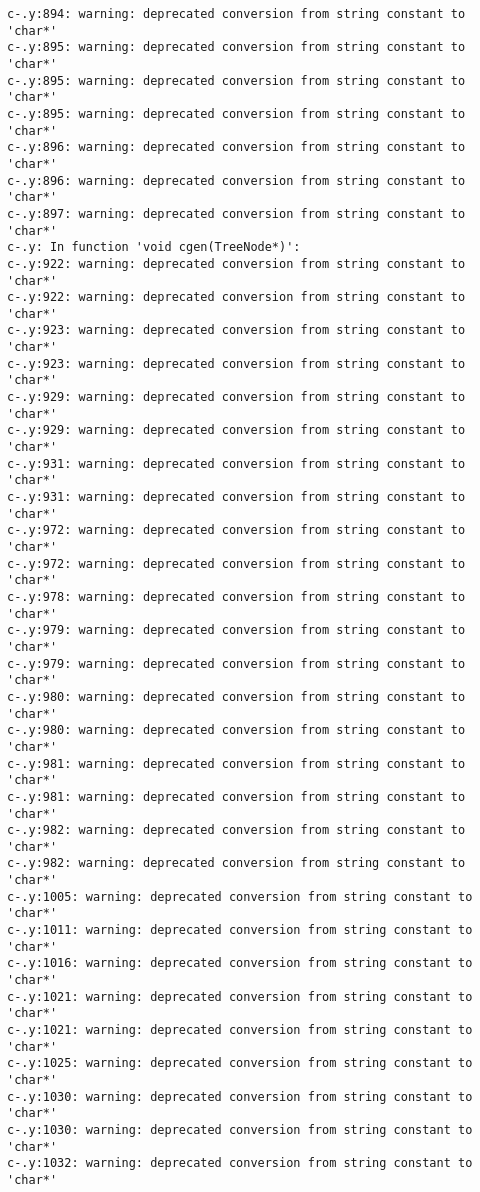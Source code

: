 \documentclass[12pt]{book}
\begin{document}
\begin{lstlisting}
c-.y:894: warning: deprecated conversion from string constant to 'char*'
c-.y:895: warning: deprecated conversion from string constant to 'char*'
c-.y:895: warning: deprecated conversion from string constant to 'char*'
c-.y:895: warning: deprecated conversion from string constant to 'char*'
c-.y:896: warning: deprecated conversion from string constant to 'char*'
c-.y:896: warning: deprecated conversion from string constant to 'char*'
c-.y:897: warning: deprecated conversion from string constant to 'char*'
c-.y: In function 'void cgen(TreeNode*)':
c-.y:922: warning: deprecated conversion from string constant to 'char*'
c-.y:922: warning: deprecated conversion from string constant to 'char*'
c-.y:923: warning: deprecated conversion from string constant to 'char*'
c-.y:923: warning: deprecated conversion from string constant to 'char*'
c-.y:929: warning: deprecated conversion from string constant to 'char*'
c-.y:929: warning: deprecated conversion from string constant to 'char*'
c-.y:931: warning: deprecated conversion from string constant to 'char*'
c-.y:931: warning: deprecated conversion from string constant to 'char*'
c-.y:972: warning: deprecated conversion from string constant to 'char*'
c-.y:972: warning: deprecated conversion from string constant to 'char*'
c-.y:978: warning: deprecated conversion from string constant to 'char*'
c-.y:979: warning: deprecated conversion from string constant to 'char*'
c-.y:979: warning: deprecated conversion from string constant to 'char*'
c-.y:980: warning: deprecated conversion from string constant to 'char*'
c-.y:980: warning: deprecated conversion from string constant to 'char*'
c-.y:981: warning: deprecated conversion from string constant to 'char*'
c-.y:981: warning: deprecated conversion from string constant to 'char*'
c-.y:982: warning: deprecated conversion from string constant to 'char*'
c-.y:982: warning: deprecated conversion from string constant to 'char*'
c-.y:1005: warning: deprecated conversion from string constant to 'char*'
c-.y:1011: warning: deprecated conversion from string constant to 'char*'
c-.y:1016: warning: deprecated conversion from string constant to 'char*'
c-.y:1021: warning: deprecated conversion from string constant to 'char*'
c-.y:1021: warning: deprecated conversion from string constant to 'char*'
c-.y:1025: warning: deprecated conversion from string constant to 'char*'
c-.y:1030: warning: deprecated conversion from string constant to 'char*'
c-.y:1030: warning: deprecated conversion from string constant to 'char*'
c-.y:1032: warning: deprecated conversion from string constant to 'char*'

\end{lstlisting}
\end{document}
